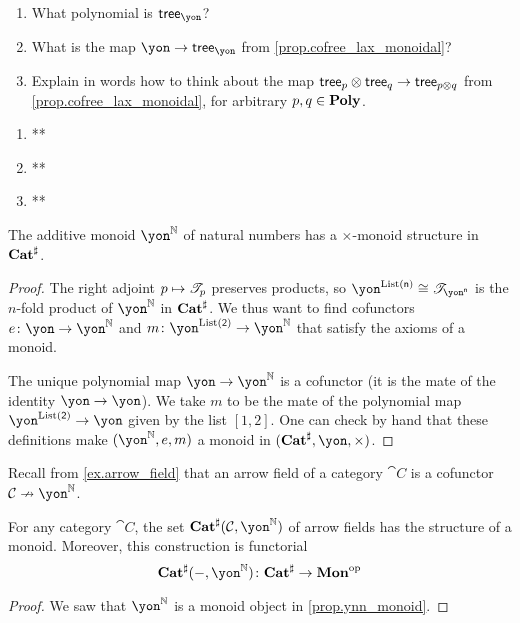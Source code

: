 \documentclass[Book-Poly]{subfiles}
\begin{document}
\begin{exercise}
\begin{enumerate}
	\item What polynomial is $\tr_\yon$?
	\item What is the map $\yon\to\tr_\yon$ from \cref{prop.cofree_lax_monoidal}?
	\item Explain in words how to think about the map $\mathsf{tree}_p\otimes\mathsf{tree}_q\to\mathsf{tree}_{p\otimes q}$ from \cref{prop.cofree_lax_monoidal}, for arbitrary $p,q\in\mathbf{Poly}$.
\qedhere
\end{enumerate}
\begin{solution}
\begin{enumerate}
    \item **
    \item **
    \item **
\end{enumerate}
\end{solution}
\end{exercise}

\begin{proposition}\label{prop.ynn_monoid}
The additive monoid $\yon^\nn$ of natural numbers has a $\times$-monoid structure in $\mathbf{Cat}^\sharp$.
\end{proposition}
\begin{proof}
The right adjoint $p\mapsto\mathscr{T}_{p}$ preserves products, so $\yon^{\List(\ord{n})}\cong\cofree{\yon^{\ord{n}}}$ is the $n$-fold product of $\yon^\nn$ in $\mathbf{Cat}^\sharp$. We thus want to find cofunctors $e\colon \yon\to\yon^\nn$ and $m\colon\yon^{\List(\2)}\to\yon^\nn$ that satisfy the axioms of a monoid. 

The unique polynomial map $\yon\to\yon^\nn$ is a cofunctor (it is the mate of the identity $\yon\to\yon$). We take $m$ to be the mate of the polynomial map $\yon^{\List(\2)}\to\yon$ given by the list $[1,2]$. One can check by hand that these definitions make $(\yon^\nn,e,m)$ a monoid in $(\smcat^\sharp,\yon,\times)$.
\end{proof}

Recall from \cref{ex.arrow_field} that an arrow field of a category $\cat{C}$ is a cofunctor $\cat{C}\cof\yon^\nn$.

\begin{corollary}
For any category $\cat{C}$, the set $\smcat^\sharp(\cat{C},\yon^\nn)$ of arrow fields has the structure of a monoid. Moreover, this construction is functorial
\[\smcat^\sharp(-,\yon^\nn)\colon\smcat^\sharp\to\Cat{Mon}\op\]
\end{corollary}
\begin{proof}
We saw that $\yon^\nn$ is a monoid object in \cref{prop.ynn_monoid}.
\end{proof}
\end{document}
